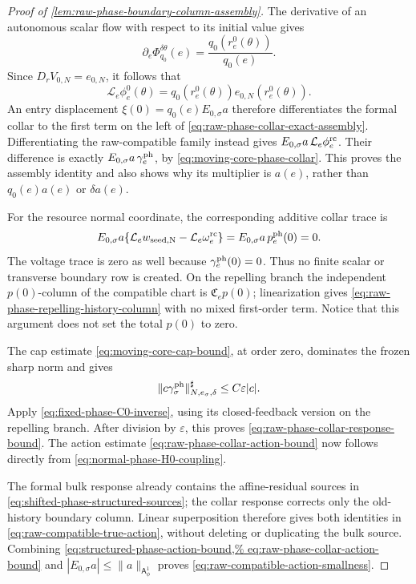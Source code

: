 \begin{proof}[Proof of
\cref{lem:raw-phase-boundary-column-assembly}]
The derivative of an autonomous scalar flow with respect to its initial
value gives
\begin{equation}
 \partial_e\Phi_{q_0}^{\delta\theta}(e)
 =\frac{q_0(r_e^0(\theta))}{q_0(e)}.              \label{eq:raw-phase-flow-initial-derivative}
\end{equation}
Since \(D_rV_{0,N}=e_{0,N}\), it follows that
\begin{equation}
 \mathcal L_e\phi_e^0(\theta)
 =q_0(r_e^0(\theta))e_{0,N}(r_e^0(\theta)).       \label{eq:formal-collar-phase-tangent}
\end{equation}
An entry displacement
\(\xi(0)=q_0(e)E_{0,\sigma}a\) therefore differentiates the formal collar
to the first term on the left of
\cref{eq:raw-phase-collar-exact-assembly}.  Differentiating the
raw-compatible family instead gives
\(E_{0,\sigma}a\,\mathcal L_e\phi_e^{\rm rc}\).
Their difference is exactly
\(E_{0,\sigma}a\,\gamma_e^{\rm ph}\), by
\cref{eq:moving-core-phase-collar}.  This proves the assembly identity and
also shows why its multiplier is \(a(e)\), rather than \(q_0(e)a(e)\) or
\(\delta a(e)\).

For the resource normal coordinate, the corresponding additive collar
trace is
\[
 E_{0,\sigma}a\{
   \mathcal L_ew_{\rm seed,N}
        -\mathcal L_e\omega_e^{\rm rc}\}
 =E_{0,\sigma}a\,p_e^{\rm ph}(0)=0.
\]
The voltage trace is zero as well because
\(\gamma_e^{\rm ph}(0)=0\).  Thus no finite scalar or transverse boundary
row is created.  On the repelling branch the independent \(p(0)\)-column
of the compatible chart is \(\mathfrak C_ep(0)\); linearization gives
\cref{eq:raw-phase-repelling-history-column} with no mixed first-order
term.  Notice that this argument does not set the total \(p(0)\) to zero.

The cap estimate \cref{eq:moving-core-cap-bound}, at order zero, dominates
the frozen sharp norm and gives
\[
 \|c\gamma_\sigma^{\rm ph}\|_{N,e_\sigma,\delta}^{\sharp}
 \le C\varepsilon|c|.
\]
Apply \cref{eq:fixed-phase-C0-inverse}, using its closed-feedback version
on the repelling branch.  After division by \(\varepsilon\), this proves
\cref{eq:raw-phase-collar-response-bound}.  The action estimate
\cref{eq:raw-phase-collar-action-bound} now follows directly from
\cref{eq:normal-phase-H0-coupling}.

The formal bulk response already contains the affine-residual sources in
\cref{eq:shifted-phase-structured-sources}; the collar response corrects
only the old-history boundary column.  Linear superposition therefore
gives both identities in
\cref{eq:raw-compatible-true-action}, without deleting or duplicating the
bulk source.  Combining
\cref{eq:structured-phase-action-bound,%
eq:raw-phase-collar-action-bound} and
\(|E_{0,\sigma}a|\le\|a\|_{\mathsf A_\phi^1}\) proves
\cref{eq:raw-compatible-action-smallness}.
\end{proof}

